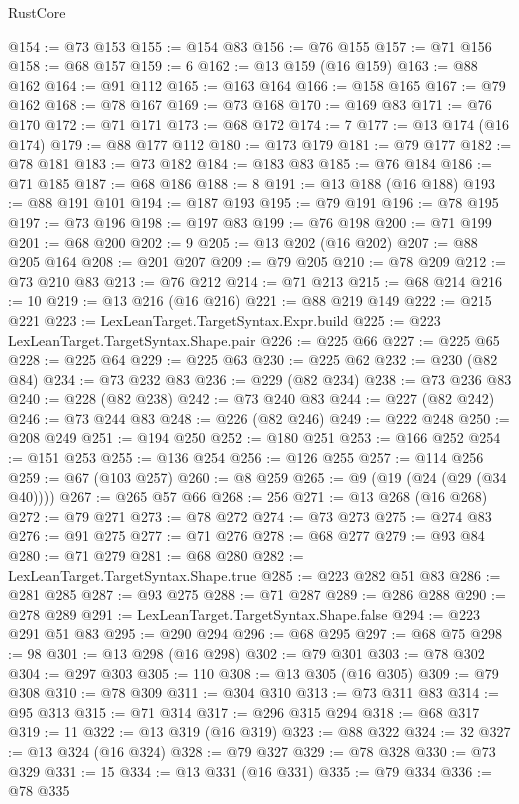 \begin{lexlean}{RustCore}
\begin{coremodule}
@154 := @73 @153
@155 := @154 @83
@156 := @76 @155
@157 := @71 @156
@158 := @68 @157
@159 := 6
@162 := @13 @159 (@16 @159)
@163 := @88 @162
@164 := @91 @112
@165 := @163 @164
@166 := @158 @165
@167 := @79 @162
@168 := @78 @167
@169 := @73 @168
@170 := @169 @83
@171 := @76 @170
@172 := @71 @171
@173 := @68 @172
@174 := 7
@177 := @13 @174 (@16 @174)
@179 := @88 @177 @112
@180 := @173 @179
@181 := @79 @177
@182 := @78 @181
@183 := @73 @182
@184 := @183 @83
@185 := @76 @184
@186 := @71 @185
@187 := @68 @186
@188 := 8
@191 := @13 @188 (@16 @188)
@193 := @88 @191 @101
@194 := @187 @193
@195 := @79 @191
@196 := @78 @195
@197 := @73 @196
@198 := @197 @83
@199 := @76 @198
@200 := @71 @199
@201 := @68 @200
@202 := 9
@205 := @13 @202 (@16 @202)
@207 := @88 @205 @164
@208 := @201 @207
@209 := @79 @205
@210 := @78 @209
@212 := @73 @210 @83
@213 := @76 @212
@214 := @71 @213
@215 := @68 @214
@216 := 10
@219 := @13 @216 (@16 @216)
@221 := @88 @219 @149
@222 := @215 @221
@223 := LexLeanTarget.TargetSyntax.Expr.build
@225 := @223 LexLeanTarget.TargetSyntax.Shape.pair
@226 := @225 @66
@227 := @225 @65
@228 := @225 @64
@229 := @225 @63
@230 := @225 @62
@232 := @230 (@82 @84)
@234 := @73 @232 @83
@236 := @229 (@82 @234)
@238 := @73 @236 @83
@240 := @228 (@82 @238)
@242 := @73 @240 @83
@244 := @227 (@82 @242)
@246 := @73 @244 @83
@248 := @226 (@82 @246)
@249 := @222 @248
@250 := @208 @249
@251 := @194 @250
@252 := @180 @251
@253 := @166 @252
@254 := @151 @253
@255 := @136 @254
@256 := @126 @255
@257 := @114 @256
@259 := @67 (@103 @257)
@260 := @8 @259
@265 := @9 (@19 (@24 (@29 (@34 @40))))
@267 := @265 @57 @66
@268 := 256
@271 := @13 @268 (@16 @268)
@272 := @79 @271
@273 := @78 @272
@274 := @73 @273
@275 := @274 @83
@276 := @91 @275
@277 := @71 @276
@278 := @68 @277
@279 := @93 @84
@280 := @71 @279
@281 := @68 @280
@282 := LexLeanTarget.TargetSyntax.Shape.true
@285 := @223 @282 @51 @83
@286 := @281 @285
@287 := @93 @275
@288 := @71 @287
@289 := @286 @288
@290 := @278 @289
@291 := LexLeanTarget.TargetSyntax.Shape.false
@294 := @223 @291 @51 @83
@295 := @290 @294
@296 := @68 @295
@297 := @68 @75
@298 := 98
@301 := @13 @298 (@16 @298)
@302 := @79 @301
@303 := @78 @302
@304 := @297 @303
@305 := 110
@308 := @13 @305 (@16 @305)
@309 := @79 @308
@310 := @78 @309
@311 := @304 @310
@313 := @73 @311 @83
@314 := @95 @313
@315 := @71 @314
@317 := @296 @315 @294
@318 := @68 @317
@319 := 11
@322 := @13 @319 (@16 @319)
@323 := @88 @322
@324 := 32
@327 := @13 @324 (@16 @324)
@328 := @79 @327
@329 := @78 @328
@330 := @73 @329
@331 := 15
@334 := @13 @331 (@16 @331)
@335 := @79 @334
@336 := @78 @335

\end{coremodule}
\end{lexlean}
